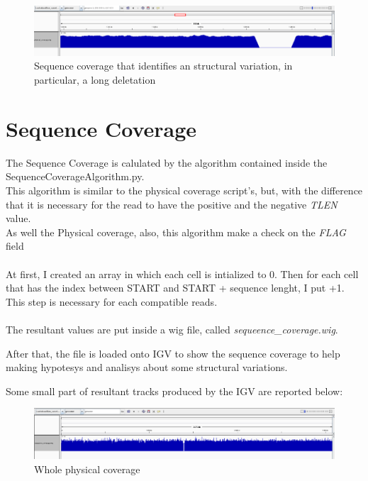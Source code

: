 				
				
 \begin{figure}[H]
				\centering
				\includegraphics[scale=0.6]{immagini/physical_coverage_3.png}
				\caption{Sequence coverage that identifies an structural variation, in particular, a long deletation}\label{fig:8}
				\end{figure}				


\section{Sequence Coverage}
The Sequence Coverage is calulated by the algorithm contained inside the SequenceCoverageAlgorithm.py.\\
This algorithm is similar to the physical coverage script's, but, with the difference that it is necessary for the read to have the positive and the negative \emph{TLEN} value.\\
As well the Physical coverage, also, this algorithm make a check on the \emph{FLAG} field
\\
\\

At first, I created an array in which each cell is intialized to 0.
Then for each cell that has the index between START and START + sequence lenght, I put +1.
This step is necessary for each compatible reads.\\\\

The resultant values are put inside a wig file, called \emph{sequeence\_coverage.wig}.

After that, the file is loaded onto IGV to show the sequence coverage to help making hypotesys and analisys about some structural variations.

Some small part of resultant tracks produced by the IGV are reported below:


 \begin{figure}[H]
				\centering
				\includegraphics[scale=0.6]{immagini/sequence_coverage_1.png}
				\caption{Whole physical coverage}\label{fig:9}
				\end{figure}


